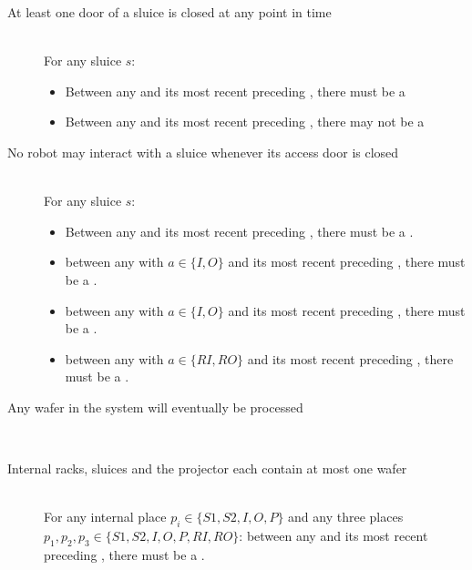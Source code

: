 
\begin{description}
 \item[At least one door of a sluice is closed at any point in time] \hfill \\
 For any sluice $s$:
 \begin{itemize}
  \item Between any  and its most recent preceding , there must be a 
  \item Between any  and its most recent preceding , there may not be a 
 \end{itemize}

 \item[No robot may interact with a sluice whenever its access door is closed] \hfill \\
For any sluice $s$:

\begin{itemize}
	\item Between any  and its most recent preceding , there must be a .
	\item between any  with $a \in \{ I, O \}$ and its most recent preceding , there must be a .
	\item between any  with $a \in \{ I, O \}$ and its most recent preceding , there must be a .
	\item between any  with $a \in \{ RI, RO \}$ and its most recent preceding , there must be a .
\end{itemize}
 
 \item[Any wafer in the system will eventually be processed] \hfill \\
 
 \item[Internal racks, sluices and the projector each contain at most one wafer] \hfill \\
 For any internal place $p_i \in \{S1, S2, I, O, P\}$ and any three places $p_1, p_2, p_3 \in \{S1, S2, I, O, P, RI, RO\}$: between any  and its most recent preceding , there must be a .
 

\end{description}

